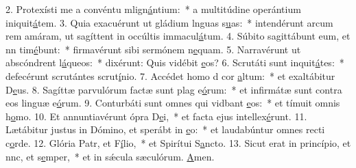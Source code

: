 2. Protexísti me a convéntu mlign\uline{á}ntium:~* a multitúdine operántium iniquit\uline{á}tem.
3. Quia exacuérunt ut gládium lnguas s\uline{u}as:~* intendérunt arcum rem amáram, ut sagíttent in occúltis immacul\uline{á}tum.
4. Súbito sagittábunt eum, et nn tim\uline{é}bunt:~* firmavérunt sibi sermónem n\uline{e}quam.
5. Narravérunt ut abscóndrent l\uline{á}queos:~* dixérunt: Quis vidébit \uline{e}os?
6. Scrutáti sunt inquit\uline{á}tes:~* defecérunt scrutántes scrut\uline{í}nio.
7. Accédet homo d cor \uline{a}ltum:~* et exaltábitur D\uline{e}us.
8. Sagíttæ parvulórum factæ sunt plag e\uline{ó}rum:~* et infirmátæ sunt contra eos linguæ e\uline{ó}rum.
9. Conturbáti sunt omnes qui vidbant \uline{e}os:~* et tímuit omnis h\uline{o}mo.
10. Et annuntiavérunt ópra D\uline{e}i,~* et facta ejus intellex\uline{é}runt.
11. Lætábitur justus in Dómino, et sperábt in \uline{e}o:~* et laudabúntur omnes recti c\uline{o}rde.
12. Glória Patr, et F\uline{í}lio,~* et Spirítui S\uline{a}ncto.
13. Sicut erat in princípio, et nnc, et s\uline{e}mper,~* et in sǽcula sæculórum. \uline{A}men.
